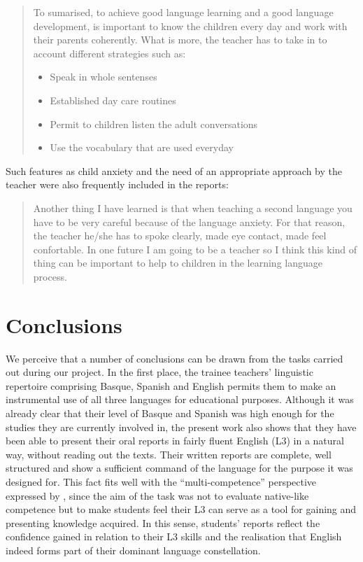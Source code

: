 \documentclass[output=paper]{../langscibook}
\begin{document}
\begin{quote}
To sumarised, to achieve good language learning and a good language development, is important to know the children every day and work with their parents coherently. What is more, the teacher has to take in to account different strategies such as:

\begin{itemize}
\item Speak in whole sentenses
\item Established day care routines
\item Permit to children listen the adult conversations
\item Use the vocabulary that are used everyday
\end{itemize}
\end{quote}

Such features as child anxiety and the need of an appropriate approach by the teacher were also frequently included in the reports:

\begin{quote}
Another thing I have learned is that when teaching a second language you have to be very careful because of the language anxiety. For that reason, the teacher he/she has to spoke clearly, made eye contact, made feel confortable. In one future I am going to be a teacher so I think this kind of thing can be important to help to children in the learning language process.
\end{quote}

 \section{Conclusions}


We perceive that a number of conclusions can be drawn from the tasks carried out during our project. In the first place, the trainee teachers’ linguistic repertoire comprising Basque, Spanish and English permits them to make an instrumental use of all three languages for educational purposes. Although it was already clear that their level of Basque and Spanish was high enough for the studies they are currently involved in, the present work also shows that they have been able to present their oral reports in fairly fluent English (L3) in a natural way, without reading out the texts. Their written reports are complete, well structured and show a sufficient command of the language for the purpose it was designed for. This fact fits well with the “multi-competence” perspective expressed by \citet{Aronin2016}, since the aim of the task was not to evaluate native-like competence but to make students feel their L3 can serve as a tool for gaining and presenting knowledge acquired. In this sense, students’ reports reflect the confidence gained in relation to their L3 skills and the realisation that English indeed forms part of their dominant language constellation.
\end{document}
